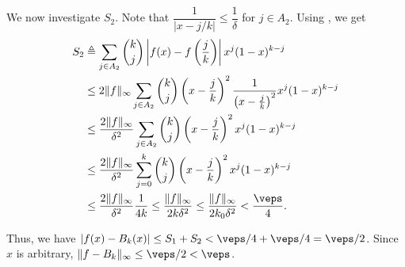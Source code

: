 \documentclass[MAS241_Note.tex]{subfiles}
\begin{document}
{    We now investigate $S_2$. Note that $\dfrac{1}{ |x-j/k| } \le \dfrac{1}{\delta}$ for $j \in A_2$.
    Using , we get
    \[
        \begin{aligned}[t]
            S_2 & \triangleq \sum_{j \in A_2} \binom{k}{j} \left|f(x) - f\left(\frac{j}{k}\right)\right|x^j (1-x)^{k-j} \\
                & \le 2 \|f\|_\infty \sum_{j \in A_2} \binom{k}{j} \left(x-\frac{j}{k}\right)^2 \frac{1}{\left(x-\frac{j}{k}\right)^2} x^j (1-x)^{k-j} \\
                & \le \frac{2\|f\|_\infty}{\delta^2} \sum_{j \in A_2} \binom{k}{j} \left(x-\frac{j}{k}\right)^2 x^j (1-x)^{k-j} \\
                & \le \frac{2\|f\|_\infty}{\delta^2} \sum_{j=0}^k \binom{k}{j} \left(x-\frac{j}{k}\right)^2 x^j (1-x)^{k-j} \\
                & \le \frac{2\|f\|_\infty}{\delta^2} \frac{1}{4k} \le \frac{\|f\|_\infty}{2k\delta^2} \le \frac{\|f\|_\infty}{2k_0\delta^2} < \frac{\veps}{4}\text{.}
        \end{aligned}
    \]

    Thus, we have $|f(x) - B_k(x)| \le S_1 + S_2 < \veps/4 + \veps/4 = \veps/2$.
    Since $x$ is arbitrary, $\|f-B_k\|_\infty \le \veps/2 < \veps$.
}
\end{document}
